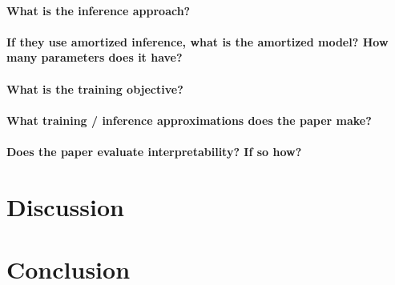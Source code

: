 \documentclass[11pt]{article}
\begin{document}
\paragraph{What is the inference approach?}

\paragraph{If they use amortized inference, what is the amortized model? How many parameters does it have?}

\paragraph{What is the training objective?}

\paragraph{What training / inference approximations does the paper make?}

\paragraph{Does the paper evaluate interpretability? If so how?}

\section{Discussion}

\section{Conclusion}



\end{document}
